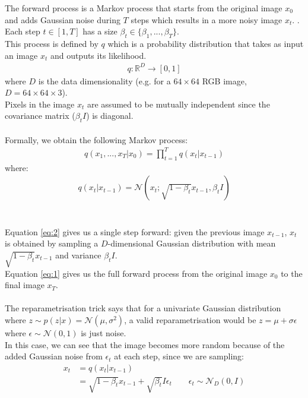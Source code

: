 \documentclass{article}
\begin{document}
The forward process is a Markov process that starts from the original image $x_0$ and adds Gaussian noise during $T$ steps which results in a more noisy image $x_t$. \cite{ho2020denoising}. \\
Each step $t \in \left[1, T\right]$ has a size $\beta_t \in \{ \beta_1, ..., \beta_T \}$. \\ 
This process is defined by $q$ which is a probability distribution that takes as input an image $x_{t}$ and outputs its likelihood.
\begin{align}
  q: \mathbb{R}^D \rightarrow [0, 1]
\end{align}
where $D$ is the data dimensionality (e.g. for a $64 \times 64$ RGB image, $D = 64 \times 64 \times 3$). \\
Pixels in the image $x_t$ are assumed to be mutually independent since the covariance matrix ($\beta_t I$) is diagonal.
\\\\
Formally, we obtain the following Markov process:
\begin{align}
  q\left(x_{1},..., x_{T} | x_0\right) = \prod_{t = 1}^T{q\left(x_t | x_{t - 1}\right)}
\end{align}
where:
\begin{align}
  q\left(x_t | x_{t-1}\right) = \mathcal{N}\left(x_t; \sqrt{1 - \beta_t}x_{t-1}, \beta_t I\right)
\end{align}
\\\\
Equation \ref{eq:2} gives us a single step forward: given the previous image $x_{t-1}$, $x_t$ is obtained by sampling a $D$-dimensional Gaussian distribution with mean $\sqrt{1 - \beta_t}x_{t-1}$ and variance $\beta_t I$. \\
Equation \ref{eq:1} gives us the full forward process from the original image $x_0$ to the final image $x_T$.
\\\\
The reparametrisation trick says that for a univariate Gaussian distribution where $z \sim p\left(z | x\right) = \mathcal{N}\left(\mu, \sigma^2\right)$, a valid reparametrisation would be $z = \mu + \sigma \epsilon$ where $\epsilon \sim \mathcal{N}\left(0, 1\right)$ is just noise. \cite{kingma2022autoencoding} \\
In this case, we can see that the image becomes more random because of the added Gaussian noise from $\epsilon_t$ at each step, since we are sampling:
\begin{align}
  x_t &= q(x_t | x_{t-1}) \\
  &= \sqrt{1 - \beta_t} x_{t-1} + \sqrt{\beta_t}I \epsilon_t \qquad \epsilon_t \sim \mathcal{N}_D \left(0, I\right)
\end{align}
\end{document}
